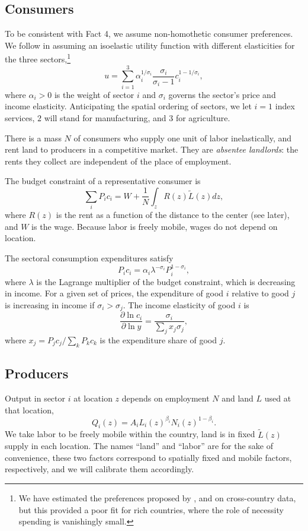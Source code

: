 \documentclass[12pt]{article}
\begin{document}
\subsection{Consumers}
To be consistent with Fact 4, we assume non-homothetic consumer preferences. We follow  in assuming an isoelastic utility function with different elasticities for the three sectors,\footnote{We have estimated the preferences proposed by ,  and  on cross-country data, but this provided a poor fit for rich countries, where the role of necessity spending is vanishingly small.}
\begin{equation}
\label{eq:Utility}
u = \sum_{i=1}^3\alpha_i^{1/\sigma_i}
	\frac {\sigma_i}
			{\sigma_i-1}
	c_i^{1-1/\sigma_i},
\end{equation}
where $\alpha_i>0$ is the weight of sector $i$ and $\sigma_i$ governs the sector's price and income elasticity. Anticipating the spatial ordering of sectors, we let $i=1$ index services, $2$ will stand for manufacturing, and $3$ for agriculture.

There is a mass $N$ of consumers who supply one unit of labor inelastically, and rent land to producers in a competitive market. They are \emph{absentee landlords}: the rents they collect are independent of the place of employment.

The budget constraint of a representative consumer is
\begin{equation}
\label{eq:BudCons}
\sum_i P_i c_i
	= W
	+ \frac 1N \int_z R(z)\tilde{L}(z)dz,
\end{equation}
where $R(z)$ is the rent as a function of the distance to the center (see later), and $W$ is the wage. Because labor is freely mobile, wages do not depend on location.

The sectoral consumption expenditures satisfy
\begin{equation}\label{eq:ConsShares}
{P_i c_i}
=
\alpha_i
\lambda^{ - \sigma_i}
{ P_i^{1-\sigma_i}},
\end{equation}
where $\lambda$ is the Lagrange multiplier of the budget constraint, which is decreasing in income. For a given set of prices, the expenditure of good $i$ relative to good $j$ is increasing in income if $\sigma_i>\sigma_j$.
The income elasticity of good $i$ is
\[
\frac 	{\partial \ln c_i}
		{\partial \ln y}
=
\frac 	{\sigma_i}
		{\sum_j x_j\sigma_j},
\]
where $x_j=P_jc_j/\sum_k P_kc_k$ is the expenditure share of good $j$.


\subsection{Producers}
Output in sector $i$ at location $z$ depends on employment $N$ and land $L$ used at that location,
\[
Q_i(z) = A_i L_i(z)^{\beta_i}N_i(z)^{1-\beta_i}.
\]
We take labor to be freely mobile within the country, land is in fixed $\tilde{L}(z)$ supply in each location. The names ``land'' and ``labor'' are for the sake of convenience, these two factors correspond to spatially fixed and mobile factors, respectively, and we will calibrate them accordingly.
\end{document}
